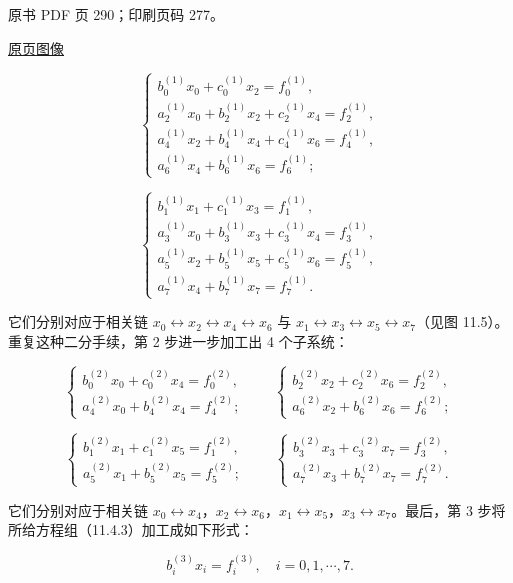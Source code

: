 原书 PDF 页 290；印刷页码 277。

\href{source-images/pdf-290.jpeg}{原页图像}

\[
\begin{cases}
b_0^{(1)}x_0+c_0^{(1)}x_2=f_0^{(1)},\\
a_2^{(1)}x_0+b_2^{(1)}x_2+c_2^{(1)}x_4=f_2^{(1)},\\
a_4^{(1)}x_2+b_4^{(1)}x_4+c_4^{(1)}x_6=f_4^{(1)},\\
a_6^{(1)}x_4+b_6^{(1)}x_6=f_6^{(1)};
\end{cases}
\]

\[
\begin{cases}
b_1^{(1)}x_1+c_1^{(1)}x_3=f_1^{(1)},\\
a_3^{(1)}x_0+b_3^{(1)}x_3+c_3^{(1)}x_4=f_3^{(1)},\\
a_5^{(1)}x_2+b_5^{(1)}x_5+c_5^{(1)}x_6=f_5^{(1)},\\
a_7^{(1)}x_4+b_7^{(1)}x_7=f_7^{(1)}.
\end{cases}
\]

它们分别对应于相关链 \(x_0\leftrightarrow x_2\leftrightarrow x_4\leftrightarrow x_6\) 与 \(x_1\leftrightarrow x_3\leftrightarrow x_5\leftrightarrow x_7\)（见图 11.5）。重复这种二分手续，第 2 步进一步加工出 4 个子系统：

\[
\begin{cases}
b_0^{(2)}x_0+c_0^{(2)}x_4=f_0^{(2)},\\
a_4^{(2)}x_0+b_4^{(2)}x_4=f_4^{(2)};
\end{cases}
\qquad
\begin{cases}
b_2^{(2)}x_2+c_2^{(2)}x_6=f_2^{(2)},\\
a_6^{(2)}x_2+b_6^{(2)}x_6=f_6^{(2)};
\end{cases}
\]

\[
\begin{cases}
b_1^{(2)}x_1+c_1^{(2)}x_5=f_1^{(2)},\\
a_5^{(2)}x_1+b_5^{(2)}x_5=f_5^{(2)};
\end{cases}
\qquad
\begin{cases}
b_3^{(2)}x_3+c_3^{(2)}x_7=f_3^{(2)},\\
a_7^{(2)}x_3+b_7^{(2)}x_7=f_7^{(2)}.
\end{cases}
\]

它们分别对应于相关链 \(x_0\leftrightarrow x_4\)，\(x_2\leftrightarrow x_6\)，\(x_1\leftrightarrow x_5\)，\(x_3\leftrightarrow x_7\)。最后，第 3 步将所给方程组（11.4.3）加工成如下形式：

\[
b_i^{(3)}x_i=f_i^{(3)},\quad i=0,1,\cdots,7.
\]

